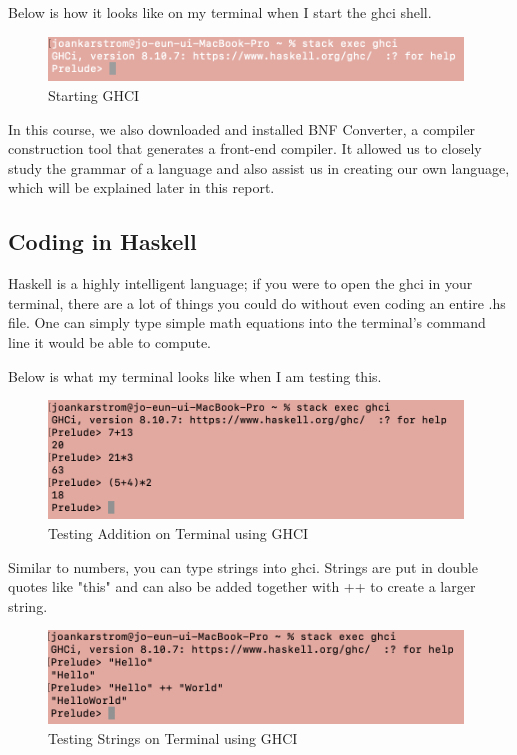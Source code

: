 \documentclass{article}
\begin{document}
\medskip\noindent
Below is how it looks like on my terminal when I start the ghci shell. 

\medskip\noindent 
\begin{figure}[htp]
    \centering
    \includegraphics[width=11cm]{STarting.png}
    \caption{Starting GHCI}
    \label{fig:Starting GHCI}
\end{figure}

\medskip\noindent
In this course, we also downloaded and installed BNF Converter, a compiler construction tool that generates a front-end compiler. It allowed us to closely study the grammar of a language and also assist us in creating our own language, which will be explained later in this report.

\subsection{Coding in Haskell}

Haskell is a highly intelligent language; if you were to open the ghci in your terminal, there are a lot of things you could do without even coding an entire .hs file. One can simply type simple math equations into the terminal’s command line it would be able to compute. 

\medskip\noindent
Below is what my terminal looks like when I am testing this. 

\medskip\noindent 
\begin{figure}[htp]
    \centering
    \includegraphics[width=11cm]{TerminalAdd.png}
    \caption{Testing Addition on Terminal using GHCI}
    \label{fig:testing addition}
\end{figure}

\medskip\noindent
Similar to numbers, you can type strings into ghci. Strings are put in double quotes like "this" and can also be added together with ++ to create a larger string.

\medskip\noindent 
\begin{figure}[htp]
    \centering
    \includegraphics[width=11cm]{TerminalStrings.png}
    \caption{Testing Strings on Terminal using GHCI}
    \label{fig:testing addition}
\end{figure}
\end{document}
